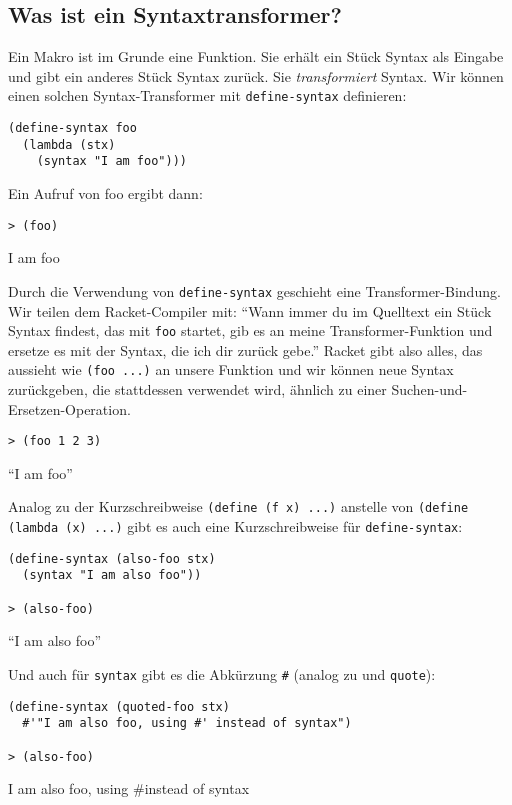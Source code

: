 \subsection{Was ist ein Syntaxtransformer?}

Ein Makro ist im Grunde eine Funktion. Sie erhält ein Stück Syntax als Eingabe und gibt ein anderes Stück Syntax zurück. Sie \textit{transformiert} Syntax. Wir können einen solchen Syntax-Transformer mit \texttt{define-syntax} definieren:

\begin{lstlisting}
(define-syntax foo
  (lambda (stx)
    (syntax "I am foo")))
\end{lstlisting}

Ein Aufruf von foo ergibt dann:

\begin{lstlisting}
> (foo)
\end{lstlisting}
{\routput {\qq}I am foo{\qq}}

Durch die Verwendung von \texttt{define-syntax} geschieht eine Transformer-Bindung. Wir teilen dem Racket-Compiler mit: ``Wann immer du im Quelltext ein Stück Syntax findest, das mit \texttt{foo} startet, gib es an meine Transformer-Funktion und ersetze es mit der Syntax, die ich dir zurück gebe.'' Racket gibt also alles, das aussieht wie \texttt{(foo ...)} an unsere Funktion und wir können neue Syntax zurückgeben, die stattdessen verwendet wird, ähnlich zu einer Suchen-und-Ersetzen-Operation.

\begin{lstlisting}
> (foo 1 2 3)
\end{lstlisting}
{\routput ``I am foo''}

Analog zu der Kurzschreibweise \texttt{(define (f x) ...)} anstelle von \texttt{(define (lambda (x) ...)} gibt es auch eine Kurzschreibweise für \texttt{define-syntax}:

\begin{lstlisting}
(define-syntax (also-foo stx)
  (syntax "I am also foo"))
  
> (also-foo)
\end{lstlisting}
{\routput ``I am also foo''}

Und auch für \texttt{syntax} gibt es die Abkürzung \texttt{\#\q} (analog zu \texttt{\q} und \texttt{quote}):

\begin{lstlisting}
(define-syntax (quoted-foo stx)
  #'"I am also foo, using #' instead of syntax")
  
> (also-foo)
\end{lstlisting}
{\routput {\qq}I am also foo, using \#\q instead of syntax{\qq}}

